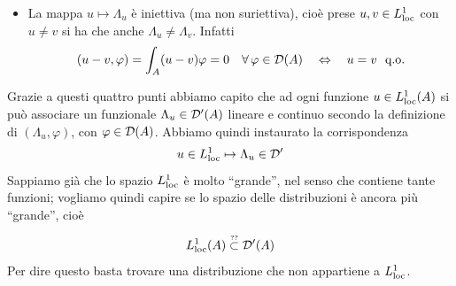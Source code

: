 \begin{itemize}
\begin{proof}
\begin{itemize}
\begin{equation*}
        (\Lambda_u,a_1\varphi_1+a_2\varphi_2)=\int_A u (a_1\varphi_1+a_2\varphi_2)=a_1(\Lambda_u,\varphi_1)+a_2(\Lambda_u,\varphi_2)
        \end{equation*}
        \item [$\triangleright$] Dobbiamo ora dimostrare la continuità del funzionale, ovvero, come fatto in \eqref{conv_2_distrib}, che
        \begin{equation*}
        \{\varphi_n\}\text{ tc }\varphi_n\xrightarrow[]{\Dc(A)}\varphi\ \Rightarrow\ (\Lambda_u,\varphi_n)\xrightarrow[]{}(\Lambda_u,\varphi)
        \end{equation*}
        Questo può essere inteso come $(\Lambda_u,\varphi_n-\varphi)\xrightarrow[]{}0$ nel vero senso di limite per numeri reali, e dunque la cosa più comoda è dimostrare che $\int_A u(\varphi_n-\varphi)\xrightarrow[]{}0$ andandone a maggiorare il modulo. \\
        Prima di fare ciò ricordiamo le ipotesi di lavoro: $\varphi$ e $\varphi_n$ stanno in $\Dc(A)$ dunque esiste un compatto $K\subset A$ che contiene $\supp\varphi$ e $\supp\varphi_n$ per ogni $n$; $\varphi_n^{(\alpha)}\to\varphi^{(\alpha)}$ uniformemente $\forall n,\alpha$ e quindi in particolare per $\alpha=0$ si ha che $\max|\varphi_n-\varphi|\to 0$; infine, $u\in L^1_{\loc}$ quindi è integrabile in $K$ secondo Lebesgue. \\
        Allora:
        \begin{equation*}
        \int_A |u(\varphi_n-\varphi)|=\int_K |u(\varphi_n-\varphi)|\leq \int_K |u|\cdot |\varphi_n-\varphi|\leq \max|\varphi_n-\varphi|\cdot \int_K |u| \to 0
        \end{equation*}
    \end{itemize}
    \end{proof}
    \item La mappa $u\mapsto\Lambda_u$ è iniettiva (ma non suriettiva), cioè prese $u,v\in L^1_{\operatorname{loc}}$ con $u\neq v$ si ha che anche $\Lambda_u\neq\Lambda_v$. Infatti
    \begin{equation*}
    (u-v,\varphi)=\int_A (u-v)\varphi=0\ \ \ \forall\varphi\in\Dc(A)\quad \Leftrightarrow\quad u=v\ \text{ q.o.}
    \end{equation*}
\end{itemize}

Grazie a questi quattro punti abbiamo capito che ad ogni funzione $u\in L^1_{\operatorname{loc}}(A)$ si può associare un funzionale $\Lambda_u\in\mathcal{D}'(A)$ lineare e continuo secondo la definizione di $(\Lambda_u,\varphi)$, con $\varphi\in \mathcal{D}(A)$. Abbiamo quindi instaurato la corrispondenza 
\begin{equation*}
u\in L^1_{\operatorname{loc}}\mapsto \Lambda_u\in\mathcal{D}'
\end{equation*}
Sappiamo già che lo spazio $L^1_{\operatorname{loc}}$ è molto ``grande'', nel senso che contiene tante funzioni; vogliamo quindi capire se lo spazio delle distribuzioni è ancora più ``grande'', cioè
\begin{equation*}
L^1_{\operatorname{loc}}(A)\overset{\underset{\mathrm{??}}{}}{\subset}\mathcal{D}'(A)
\end{equation*}
Per dire questo basta trovare una distribuzione che non appartiene a $L^1_{\operatorname{loc}}$.

